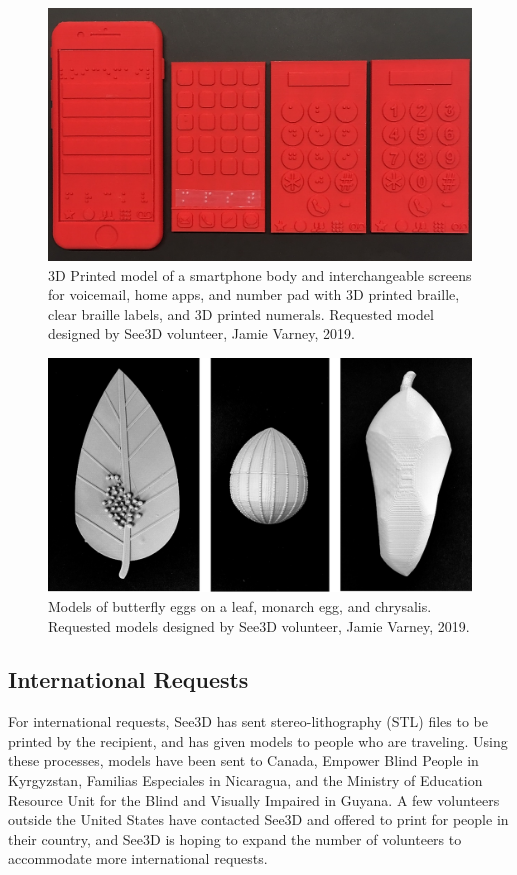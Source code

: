 \documentclass[11.5pt]{sig-alternate} %
\begin{document}
\begin{large}
\begin{figure}[ht]
    \centering
    \includegraphics[width=1\linewidth]{1116_Fig2.png}
    \caption{3D Printed model of a smartphone body and interchangeable screens for voicemail, home apps, and number pad with 3D printed braille, clear braille labels, and 3D printed numerals. Requested model designed by See3D volunteer, Jamie Varney, 2019.}
\end{figure}

\begin{figure}[ht]
    \centering
    \includegraphics[width=1\linewidth]{1116_Fig3.png}
    \caption{Models of butterfly eggs on a leaf, monarch egg, and chrysalis. Requested models designed by See3D volunteer, Jamie Varney, 2019.}
\end{figure}

\subsection*{International Requests}

For international requests, See3D has sent stereo-lithography (STL) files to be printed by the recipient, and has given models to people who are traveling. Using these processes, models have been sent to Canada, Empower Blind People in Kyrgyzstan, Familias Especiales in Nicaragua, and the Ministry of Education Resource Unit for the Blind and Visually Impaired in Guyana. A few volunteers outside the United States have contacted See3D and offered to print for people in their country, and See3D is hoping to expand the number of volunteers to accommodate more international requests. 


\end{large}
\end{document}
